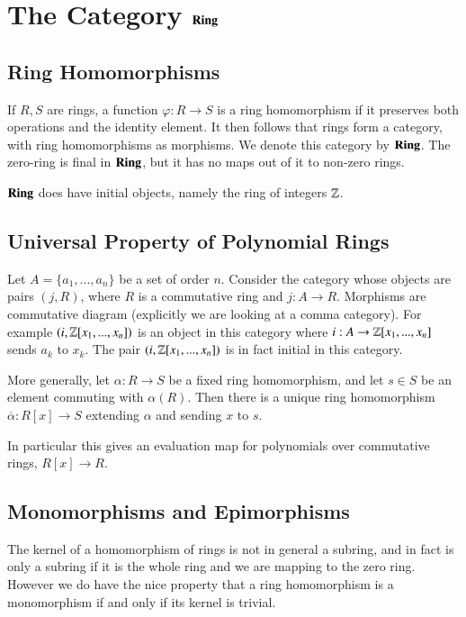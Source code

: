 \documentclass[12pt, a4paper, oneside, openright, titlepage]{book}
\begin{document}
\chapter{The Category $\normalfont\textbf{Ring}$}


\section{Ring Homomorphisms}

If $R,S$ are rings, a function $\varphi:R\rightarrow S$ is a ring homomorphism if it preserves both operations and the identity element. It then follows that rings form a category, with ring homomorphisms as morphisms. We denote this category by $\normalfont\textbf{Ring}$. The zero-ring is final in $\normalfont\textbf{Ring}$, but it has no maps out of it to non-zero rings.

$\normalfont\textbf{Ring}$ does have initial objects, namely the ring of integers $\mathbb Z$.

\section{Universal Property of Polynomial Rings}

Let $A = \{a_1,...,a_n\}$ be a set of order $n$. Consider the category whose objects are pairs $(j,R)$, where $R$ is a commutative ring and $j:A\rightarrow R$. Morphisms are commutative diagram (explicitly we are looking at a comma category). For example $(i,\mathbb Z[x_1,...,x_n])$ is an object in this category where $i:A\rightarrow \mathbb Z[x_1,...,x_n]$ sends $a_k$ to $x_k$. The pair $(i,\mathbb Z[x_1,...,x_n])$ is in fact initial in this category.

\begin{eg}
    More generally, let $\alpha:R\rightarrow S$ be a fixed ring homomorphism, and let $s \in S$ be an element commuting with $\alpha(R)$. Then there is a unique ring homomorphism $\overline{\alpha}:R[x]\rightarrow S$ extending $\alpha$ and sending $x$ to $s$.
\end{eg}

In particular this gives an evaluation map for polynomials over commutative rings, $R[x]\rightarrow R$.


\section{Monomorphisms and Epimorphisms}

The kernel of a homomorphism of rings is not in general a subring, and in fact is only a subring if it is the whole ring and we are mapping to the zero ring. However we do have the nice property that a ring homomorphism is a monomorphism if and only if its kernel is trivial.
\end{document}
